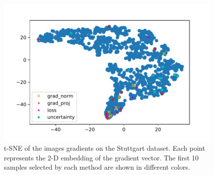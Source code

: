 \documentclass[letterpaper, 10 pt, conference]{ieeeconf}  %
\begin{document}
   

%   
%   

    
                   \begin{figure}
    \centering
    \includegraphics[width=\linewidth]{pics/tsne_all.pdf}
   		\caption{t-SNE of the images gradients on the Stuttgart dataset. Each point represents the 2-D embedding of the gradient vector. The first 10 samples selected by each method are shown in different colors.}
		\label{fig:tsne}    		
   \end{figure}
    
\end{document}
